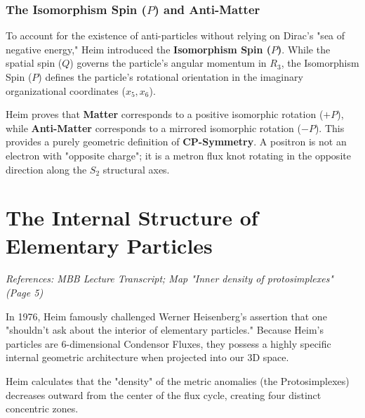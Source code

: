\documentclass[11pt,a4paper,oneside]{article}
\begin{document}
\subsubsection{The Isomorphism Spin ($P$) and Anti-Matter}
To account for the existence of anti-particles without relying on Dirac's "sea of negative energy," Heim introduced the \textbf{Isomorphism Spin ($P$)}. While the spatial spin ($Q$) governs the particle's angular momentum in $R_3$, the Isomorphism Spin ($P$) defines the particle's rotational orientation in the imaginary organizational coordinates ($x_5, x_6$). 

Heim proves that \textbf{Matter} corresponds to a positive isomorphic rotation ($+P$), while \textbf{Anti-Matter} corresponds to a mirrored isomorphic rotation ($-P$). This provides a purely geometric definition of \textbf{CP-Symmetry}. A positron is not an electron with "opposite charge"; it is a metron flux knot rotating in the opposite direction along the $S_2$ structural axes.

\section{The Internal Structure of Elementary Particles}
\label{sec:internal_structure}

\textit{References: MBB Lecture Transcript; Map "Inner density of protosimplexes" (Page 5)}

In 1976, Heim famously challenged Werner Heisenberg's assertion that one "shouldn't ask about the interior of elementary particles." Because Heim's particles are 6-dimensional Condensor Fluxes, they possess a highly specific internal geometric architecture when projected into our 3D space.

Heim calculates that the "density" of the metric anomalies (the Protosimplexes) decreases outward from the center of the flux cycle, creating four distinct concentric zones. 
\end{document}
